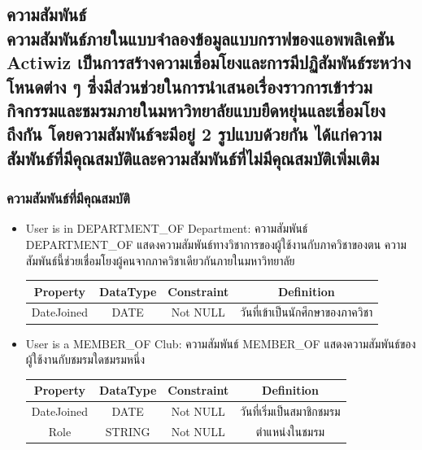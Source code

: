 \documentclass[14pt,oneside,openright,a4paper]{cpe-thai-project}
\begin{document}
    \subsection{ความสัมพันธ์ \\ ความสัมพันธ์ภายในแบบจำลองข้อมูลแบบกราฟของแอพพลิเคชัน Actiwiz เป็นการสร้างความเชื่อมโยงและการมีปฏิสัมพันธ์ระหว่างโหนดต่าง ๆ ซึ่งมีส่วนช่วยในการนำเสนอเรื่องราวการเข้าร่วมกิจกรรมและชมรมภายในมหาวิทยาลัยแบบยืดหยุ่นและเชื่อมโยงถึงกัน โดยความสัมพันธ์จะมีอยู่ 2 รูปแบบด้วยกัน ได้แก่ความสัมพันธ์ที่มีคุณสมบัติและความสัมพันธ์ที่ไม่มีคุณสมบัติเพิ่มเติม}

    \subsubsection{ความสัมพันธ์ที่มีคุณสมบัติ}
    \begin{itemize}
      \normalsize
      \item User is in DEPARTMENT\_OF Department: ความสัมพันธ์ DEPARTMENT\_OF แสดงความสัมพันธ์ทางวิชาการของผู้ใช้งานกับภาควิชาของตน ความสัมพันธ์นี้ช่วยเชื่อมโยงผู้คนจากภาควิชาเดียวกันภายในมหาวิทยาลัย
        \begin{center}
          \begin{tabular}{|c|c|c|c|}
          \hline
          \rowcolor[HTML]{9FC5E8} 
          Property   & DataType & Constraint & Definition \\ \hline
          DateJoined & DATE     & Not NULL    & วันที่เข้าเป็นนักศึกษาของภาควิชา \\ \hline
          \end{tabular}
          \label{tab:DepartmentRelationship}
        \end{center}
      \item User is a MEMBER\_OF Club: ความสัมพันธ์ MEMBER\_OF แสดงความสัมพันธ์ของผู้ใช้งานกับชมรมใดชมรมหนึ่ง
        \begin{center}
          \begin{tabular}{|c|c|c|c|}
          \hline
          \rowcolor[HTML]{9FC5E8} 
          Property   & DataType & Constraint & Definition \\ \hline
          DateJoined & DATE     & Not NULL    & วันที่เริ่มเป็นสมาชิกชมรม \\ \hline
          Role       & STRING   & Not NULL    & ตำแหน่งในชมรม \\ \hline
          \end{tabular}
          \label{tab:ClubRelationship}

\end{center}
\end{itemize}
\end{document}
